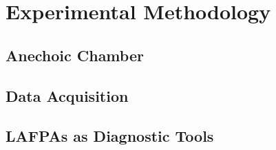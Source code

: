 \chapter{Experimental Methodology}
\label{methodology}

\section{Anechoic Chamber}

\section{Data Acquisition}

\section{LAFPAs as Diagnostic Tools}